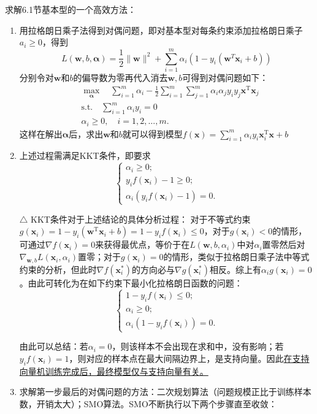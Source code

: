 \documentclass{ctexart}
\begin{document}
					求解6.1节基本型的一个高效方法：\begin{enumerate}[1.]
						\item 用拉格朗日乘子法得到对偶问题，即对基本型对每条约束添加拉格朗日乘子$a_i\ge0$，得到\[L(\bm{w},b,\bm{\alpha})=\frac{1}{2}\parallel\bm{w}\parallel^2+\sum_{i=1}^{m}\alpha_i(1-y_i(\bm{w}^T\bm{x}_i+b))\]分别令对$\bm{w}$和$b$的偏导数为零再代入消去$\bm{w},b$可得到对偶问题如下：\begin{align*}
							& \max\limits_{\bm{\alpha}}\quad\sum_{i=1}^{m}\alpha_i-\frac{1}{2}\sum_{i=1}^{m}\sum_{j=1}^{m}\alpha_i\alpha_jy_iy_j\bm{x}^{\mathrm{T}}\bm{x}_j\\
							& \mathrm{s.t.}\quad\sum_{i=1}^{m}\alpha_iy_i=0\\
							& \alpha_i\ge0,\quad i=1,2,\dots,m.
						\end{align*}
						这样在解出$\bm{\alpha}$后，求出$\bm{w}$和$b$就可以得到模型$f(\bm{x})=\sum_{i=1}^{m}\alpha_iy_i\bm{x}_i^{\mathrm{T}}\bm{x}+b$
						\item 上述过程需满足KKT条件，即要求\[\left\{\begin{aligned}
							\alpha_i\ge0;\\
							y_if(\bm{x}_i)-1\ge0;\\
							\alpha_i(y_if(\bm{x}_i)-1)=0.
						\end{aligned}\right.\]\begin{framed}
							$\triangle$ KKT条件对于上述结论的具体分析过程： 对于不等式约束$g(\bm{x}_i)=1-y_i(\bm{w}^{\mathrm{T}}\bm{x}_i+b)=1-y_if(\bm{x}_i)\le0$，对于$g(\bm{x}_i)<0$的情形，可通过$\nabla f(\bm{x}_i)=0$来获得最优点，等价于在$L(\bm{w},b,\alpha_i)$中对$\alpha_i$置零然后对$\nabla_{\bm{w},b}L(\bm{x}_i,\alpha_i)$置零；对于$g(\bm{x}_i)=0$的情形，类似于拉格朗日乘子法中等式约束的分析，但此时$\nabla f(\bm{x}_i^*)$的方向必与$\nabla g(\bm{x}_i^*)$相反。综上有$\alpha_i g(\bm{x}_i)=0$。由此可转化为在如下约束下最小化拉格朗日函数的问题：\[\left\{\begin{aligned}
							1-y_if(\bm{x}_i)\le0;\\
							\alpha_i\ge0;\\
							\alpha_i(1-y_if(\bm{x}_i))=0.
							\end{aligned}\right.\]
						\end{framed}
						由此可以总结：若$\alpha_i=0$，则该样本不会出现在求和中，没有影响；若$y_if(\bm{x}_i)=1$，则对应的样本点在最大间隔边界上，是支持向量。因此\underline{在支持向量机训练完成后，最终模型仅与支持向量有关。}
						\item 求解第一步最后的对偶问题的方法：二次规划算法（问题规模正比于训练样本数，开销太大）；SMO算法。SMO不断执行以下两个步骤直至收敛：\begin{itemize}

\end{itemize}
\end{enumerate}
\end{document}
